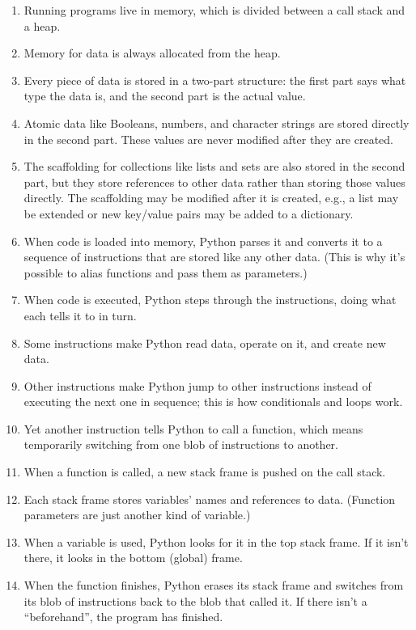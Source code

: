 \begin{enumerate}
\item
  Running programs live in memory, which is divided between a call
  stack and a heap.
\item
  Memory for data is always allocated from the heap.
\item
  Every piece of data is stored in a two-part structure: the first
  part says what type the data is, and the second part is the actual
  value.
\item
  Atomic data like Booleans, numbers, and character strings are stored
  directly in the second part. These values are never modified after
  they are created.
\item
  The scaffolding for collections like lists and sets are also stored
  in the second part, but they store references to other data rather
  than storing those values directly. The scaffolding may be modified
  after it is created, e.g., a list may be extended or new key/value
  pairs may be added to a dictionary.
\item
  When code is loaded into memory, Python parses it and converts it to
  a sequence of instructions that are stored like any other data.
  (This is why it's possible to alias functions and pass them as
  parameters.)
\item
  When code is executed, Python steps through the instructions, doing
  what each tells it to in turn.
\item
  Some instructions make Python read data, operate on it, and create
  new data.
\item
  Other instructions make Python jump to other instructions instead of
  executing the next one in sequence; this is how conditionals and
  loops work.
\item
  Yet another instruction tells Python to call a function, which means
  temporarily switching from one blob of instructions to another.
\item
  When a function is called, a new stack frame is pushed on the call
  stack.
\item
  Each stack frame stores variables' names and references to data.
  (Function parameters are just another kind of variable.)
\item
  When a variable is used, Python looks for it in the top stack frame.
  If it isn't there, it looks in the bottom (global) frame.
\item
  When the function finishes, Python erases its stack frame and
  switches from its blob of instructions back to the blob that called
  it. If there isn't a ``beforehand'', the program has finished.
\end{enumerate}

